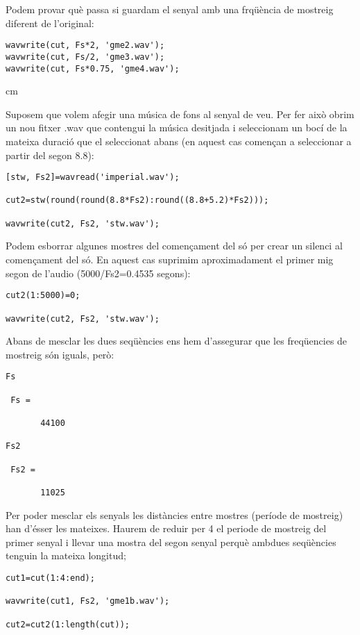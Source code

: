\documentclass{article}
\begin{document}
Podem provar què passa si guardam el senyal amb una frqüència de mostreig diferent de l'original:

\begin{verbatim}
wavwrite(cut, Fs*2, 'gme2.wav');
wavwrite(cut, Fs/2, 'gme3.wav');
wavwrite(cut, Fs*0.75, 'gme4.wav');
\end{verbatim}



 cm

Suposem que volem afegir una música de fons al senyal de veu.
Per fer això obrim un nou fitxer .wav que contengui la música desitjada i seleccionam un bocí de la
mateixa duració que el seleccionat abans (en aquest cas començan a seleccionar a partir del segon $8.8$):
\begin{verbatim}
[stw, Fs2]=wavread('imperial.wav');

cut2=stw(round(round(8.8*Fs2):round((8.8+5.2)*Fs2)));

wavwrite(cut2, Fs2, 'stw.wav');
\end{verbatim}

Podem esborrar algunes mostres del començament del só per crear un silenci al començament del só.
En aquest cas suprimim aproximadament el primer mig segon de l'audio (5000/Fs2=0.4535 segons):
\begin{verbatim}
cut2(1:5000)=0;

wavwrite(cut2, Fs2, 'stw.wav');
\end{verbatim}

Abans de mesclar les dues seqüències ens hem d'assegurar que les freqüencies de mostreig són iguals,
però:
\begin{verbatim}
Fs

 Fs =

       44100

Fs2

 Fs2 =

       11025
\end{verbatim}

Per poder mesclar els senyals les distàncies entre mostres (període de mostreig) han d'ésser les mateixes.
Haurem de reduir per 4 el periode de mostreig del primer senyal i llevar una mostra del segon senyal perquè
ambdues seqüències tenguin la mateixa longitud;

\begin{verbatim}
cut1=cut(1:4:end);

wavwrite(cut1, Fs2, 'gme1b.wav');

cut2=cut2(1:length(cut));
\end{verbatim}
\end{document}
